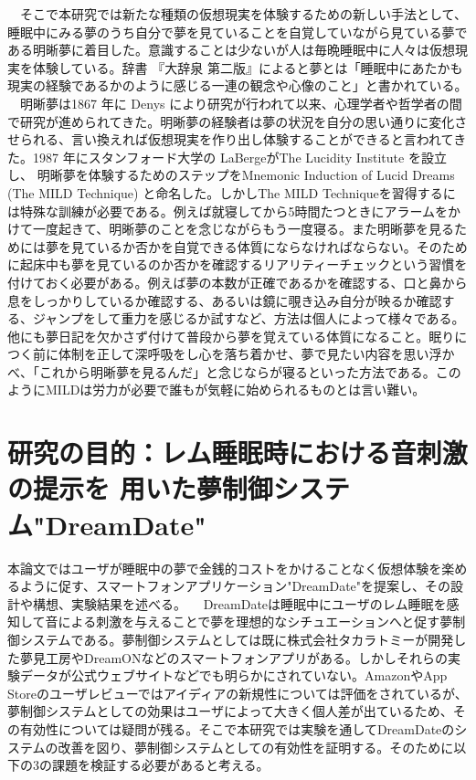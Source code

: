 　そこで本研究では新たな種類の仮想現実を体験するための新しい手法として、睡眠中にみる夢のうち自分で夢を見ていることを自覚していながら見ている夢である明晰夢に着目した。意識することは少ないが人は毎晩睡眠中に人々は仮想現実を体験している。辞書 『大辞泉 第二版』によると夢とは「睡眠中にあたかも現実の経験であるかのように感じる一連の観念や心像のこと」\cite{dream}と書かれている。\\
　明晰夢は1867 年に Denys により研究が行われて以来\cite{saintDenys}、心理学者や哲学者の間で研究が進められてきた。明晰夢の経験者は夢の状況を自分の思い通りに変化させられる、言い換えれば仮想現実を作り出し体験することができると言われてきた。1987 年にスタンフォード大学の LaBergeがThe Lucidity Institute を設立し、 明晰夢を体験するためのステップをMnemonic Induction of Lucid Dreams (The MILD Technique) と命名した\cite{LaBerge}。しかしThe MILD Techniqueを習得するには特殊な訓練が必要である。例えば就寝してから5時間たつときにアラームをかけて一度起きて、明晰夢のことを念じながらもう一度寝る。また明晰夢を見るためには夢を見ているか否かを自覚できる体質にならなければならない。そのために起床中も夢を見ているのか否かを確認するリアリティーチェックという習慣を付けておく必要がある。例えば夢の本数が正確であるかを確認する、口と鼻から息をしっかりしているか確認する、あるいは鏡に覗き込み自分が映るか確認する、ジャンプをして重力を感じるか試すなど、方法は個人によって様々である。他にも夢日記を欠かさず付けて普段から夢を覚えている体質になること。眠りにつく前に体制を正して深呼吸をし心を落ち着かせ、夢で見たい内容を思い浮かべ、「これから明晰夢を見るんだ」と念じならが寝るといった方法である。このようにMILDは労力が必要で誰もが気軽に始められるものとは言い難い。

\section{研究の目的：レム睡眠時における音刺激の提示を 用いた夢制御システム"DreamDate"}
本論文ではユーザが睡眠中の夢で金銭的コストをかけることなく仮想体験を楽めるように促す、スマートフォンアプリケーション"DreamDate"を提案し、その設計や構想、実験結果を述べる。
　DreamDateは睡眠中にユーザのレム睡眠を感知して音による刺激を与えることで夢を理想的なシチュエーションへと促す夢制御システムである。夢制御システムとしては既に株式会社タカラトミーが開発した夢見工房\cite{takaratomi}やDreamON\cite{dreamOn}などのスマートフォンアプリがある。しかしそれらの実験データが公式ウェブサイトなどでも明らかにされていない。AmazonやApp Storeのユーザレビューではアイディアの新規性については評価をされているが、夢制御システムとしての効果はユーザによって大きく個人差が出ているため、その有効性については疑問が残る。そこで本研究では実験を通してDreamDateのシステムの改善を図り、夢制御システムとしての有効性を証明する。そのために以下の3の課題を検証する必要があると考える。

